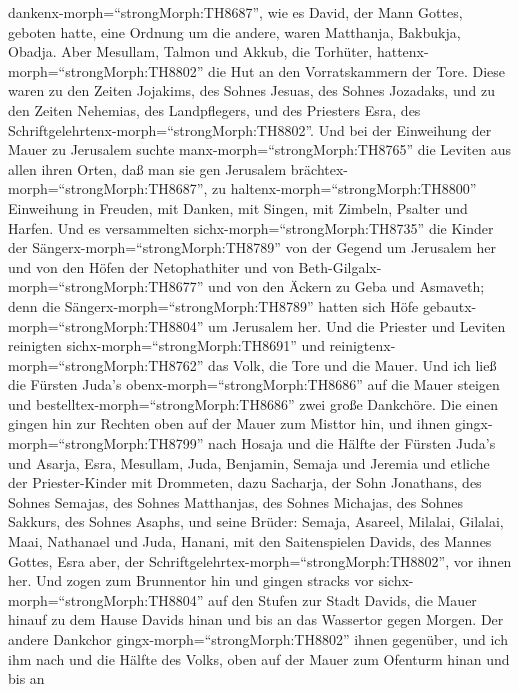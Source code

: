 dankenx-morph=``strongMorph:TH8687'', wie es David, der Mann Gottes,
geboten hatte, eine Ordnung um die andere,  waren
Matthanja, Bakbukja, Obadja. Aber Mesullam, Talmon und Akkub, die
Torhüter, hattenx-morph=``strongMorph:TH8802'' die Hut an den
Vorratskammern der Tore.  Diese waren zu den Zeiten
Jojakims, des Sohnes Jesuas, des Sohnes Jozadaks, und zu den Zeiten
Nehemias, des Landpflegers, und des Priesters Esra, des
Schriftgelehrtenx-morph=``strongMorph:TH8802''.  Und bei
der Einweihung der Mauer zu Jerusalem suchte
manx-morph=``strongMorph:TH8765'' die Leviten aus allen ihren Orten, daß
man sie gen Jerusalem brächtex-morph=``strongMorph:TH8687'', zu
haltenx-morph=``strongMorph:TH8800'' Einweihung in Freuden, mit Danken,
mit Singen, mit Zimbeln, Psalter und Harfen.  Und es
versammelten sichx-morph=``strongMorph:TH8735'' die Kinder der
Sängerx-morph=``strongMorph:TH8789'' von der Gegend um Jerusalem her und
von den Höfen der Netophathiter  und von
Beth-Gilgalx-morph=``strongMorph:TH8677'' und von den Äckern zu Geba und
Asmaveth; denn die Sängerx-morph=``strongMorph:TH8789'' hatten sich Höfe
gebautx-morph=``strongMorph:TH8804'' um Jerusalem her.  Und
die Priester und Leviten reinigten sichx-morph=``strongMorph:TH8691''
und reinigtenx-morph=``strongMorph:TH8762'' das Volk, die Tore und die
Mauer.  Und ich ließ die Fürsten Juda's
obenx-morph=``strongMorph:TH8686'' auf die Mauer steigen und
bestelltex-morph=``strongMorph:TH8686'' zwei große Dankchöre. Die einen
gingen hin zur Rechten oben auf der Mauer zum Misttor hin, 
und ihnen gingx-morph=``strongMorph:TH8799'' nach Hosaja und die Hälfte
der Fürsten Juda's  und Asarja, Esra, Mesullam,
 Juda, Benjamin, Semaja und Jeremia  und
etliche der Priester-Kinder mit Drommeten, dazu Sacharja, der Sohn
Jonathans, des Sohnes Semajas, des Sohnes Matthanjas, des Sohnes
Michajas, des Sohnes Sakkurs, des Sohnes Asaphs,  und seine
Brüder: Semaja, Asareel, Milalai, Gilalai, Maai, Nathanael und Juda,
Hanani, mit den Saitenspielen Davids, des Mannes Gottes, Esra aber, der
Schriftgelehrtex-morph=``strongMorph:TH8802'', vor ihnen her.
 Und zogen zum Brunnentor hin und gingen stracks vor
sichx-morph=``strongMorph:TH8804'' auf den Stufen zur Stadt Davids, die
Mauer hinauf zu dem Hause Davids hinan und bis an das Wassertor gegen
Morgen.  Der andere Dankchor
gingx-morph=``strongMorph:TH8802'' ihnen gegenüber, und ich ihm nach und
die Hälfte des Volks, oben auf der Mauer zum Ofenturm hinan und bis an
